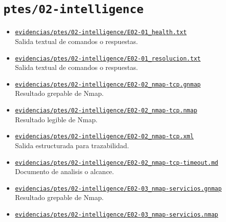 \section{\texorpdfstring{\nolinkurl{ptes/02-intelligence}}{ptes/02-intelligence}}
\begin{itemize}[leftmargin=1.2em]
  \item \href{https://github.com/gamurigm/inventrack-ptes-report/blob/main/evidencias/ptes/02-intelligence/E02-01_health.txt}{\nolinkurl{evidencias/ptes/02-intelligence/E02-01_health.txt}}\\
  {\small Salida textual de comandos o respuestas.}
  \item \href{https://github.com/gamurigm/inventrack-ptes-report/blob/main/evidencias/ptes/02-intelligence/E02-01_resolucion.txt}{\nolinkurl{evidencias/ptes/02-intelligence/E02-01_resolucion.txt}}\\
  {\small Salida textual de comandos o respuestas.}
  \item \href{https://github.com/gamurigm/inventrack-ptes-report/blob/main/evidencias/ptes/02-intelligence/E02-02_nmap-tcp.gnmap}{\nolinkurl{evidencias/ptes/02-intelligence/E02-02_nmap-tcp.gnmap}}\\
  {\small Resultado grepable de Nmap.}
  \item \href{https://github.com/gamurigm/inventrack-ptes-report/blob/main/evidencias/ptes/02-intelligence/E02-02_nmap-tcp.nmap}{\nolinkurl{evidencias/ptes/02-intelligence/E02-02_nmap-tcp.nmap}}\\
  {\small Resultado legible de Nmap.}
  \item \href{https://github.com/gamurigm/inventrack-ptes-report/blob/main/evidencias/ptes/02-intelligence/E02-02_nmap-tcp.xml}{\nolinkurl{evidencias/ptes/02-intelligence/E02-02_nmap-tcp.xml}}\\
  {\small Salida estructurada para trazabilidad.}
  \item \href{https://github.com/gamurigm/inventrack-ptes-report/blob/main/evidencias/ptes/02-intelligence/E02-02_nmap-tcp-timeout.md}{\nolinkurl{evidencias/ptes/02-intelligence/E02-02_nmap-tcp-timeout.md}}\\
  {\small Documento de analisis o alcance.}
  \item \href{https://github.com/gamurigm/inventrack-ptes-report/blob/main/evidencias/ptes/02-intelligence/E02-03_nmap-servicios.gnmap}{\nolinkurl{evidencias/ptes/02-intelligence/E02-03_nmap-servicios.gnmap}}\\
  {\small Resultado grepable de Nmap.}
  \item \href{https://github.com/gamurigm/inventrack-ptes-report/blob/main/evidencias/ptes/02-intelligence/E02-03_nmap-servicios.nmap}{\nolinkurl{evidencias/ptes/02-intelligence/E02-03_nmap-servicios.nmap}}\\

\end{itemize}
